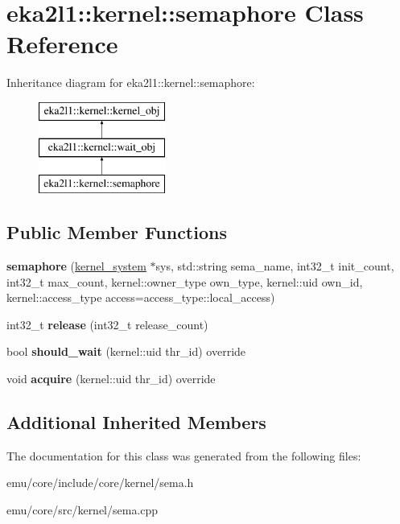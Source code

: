 \hypertarget{classeka2l1_1_1kernel_1_1semaphore}{}\section{eka2l1\+:\+:kernel\+:\+:semaphore Class Reference}
\label{classeka2l1_1_1kernel_1_1semaphore}
Inheritance diagram for eka2l1\+:\+:kernel\+:\+:semaphore\+:\begin{figure}[H]
\begin{center}
\leavevmode
\includegraphics[height=3.000000cm]{classeka2l1_1_1kernel_1_1semaphore}
\end{center}
\end{figure}
\subsection*{Public Member Functions}
\begin{DoxyCompactItemize}
\item 
\mbox{\label{classeka2l1_1_1kernel_1_1semaphore_abcb6ca62e62a867f26708a493a8cdfc0}} 
{\bfseries semaphore} (\mbox{\hyperlink{classeka2l1_1_1kernel__system}{kernel\+\_\+system}} $\ast$sys, std\+::string sema\+\_\+name, int32\+\_\+t init\+\_\+count, int32\+\_\+t max\+\_\+count, kernel\+::owner\+\_\+type own\+\_\+type, kernel\+::uid own\+\_\+id, kernel\+::access\+\_\+type access=access\+\_\+type\+::local\+\_\+access)
\item 
\mbox{\label{classeka2l1_1_1kernel_1_1semaphore_a75422ed172d983744c1e9d77d6be7ede}} 
int32\+\_\+t {\bfseries release} (int32\+\_\+t release\+\_\+count)
\item 
\mbox{\label{classeka2l1_1_1kernel_1_1semaphore_ab955c755004cfc3d4918bd8d18e7db66}} 
bool {\bfseries should\+\_\+wait} (kernel\+::uid thr\+\_\+id) override
\item 
\mbox{\label{classeka2l1_1_1kernel_1_1semaphore_a4f661acfc54b4105c09ced98d8e79fb6}} 
void {\bfseries acquire} (kernel\+::uid thr\+\_\+id) override
\end{DoxyCompactItemize}
\subsection*{Additional Inherited Members}


The documentation for this class was generated from the following files\+:\begin{DoxyCompactItemize}
\item 
emu/core/include/core/kernel/sema.\+h\item 
emu/core/src/kernel/sema.\+cpp\end{DoxyCompactItemize}
